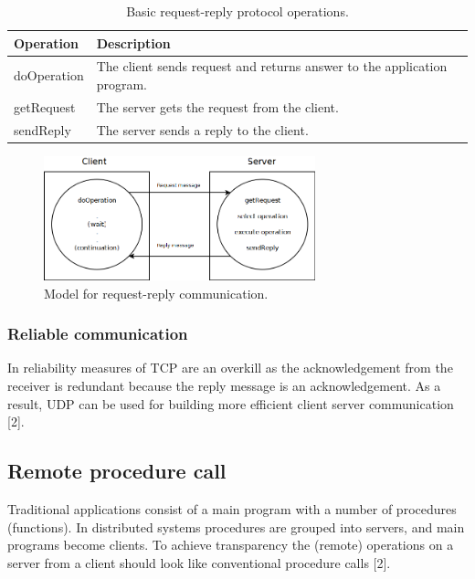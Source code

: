 \begin{table}
	\caption{Basic request-reply protocol operations.}
	\label{tab:}
	\begin{tabular}{p{150px} | p{250px}}
		\textbf{Operation} & \textbf{Description} \\
		\hline
		doOperation		& The client sends request and returns answer to the application program. \\
		getRequest		& The server gets the request from the client. \\
		sendReply			& The server sends a reply to the client. \\
		\hline
	\end{tabular}
\end{table}


\begin{figure}
	\begin{center}
		\includegraphics[width=0.7\textwidth]{img/requestreplycommunication}
	\end{center}
	\caption{Model for request-reply communication.}
	\label{fig:requestreplycommunication}
\end{figure}



\subsubsection{Reliable communication}

In reliability measures of TCP are an overkill as the acknowledgement from the receiver is redundant because the reply message is an acknowledgement. As a result, UDP can be used for building more efficient client server communication [2].



\subsection{Remote procedure call}

Traditional applications consist of a main program with a number of procedures (functions). In distributed systems procedures are grouped into servers, and main programs become clients. To achieve transparency the (remote) operations on a server from a client should look like conventional procedure calls [2].

